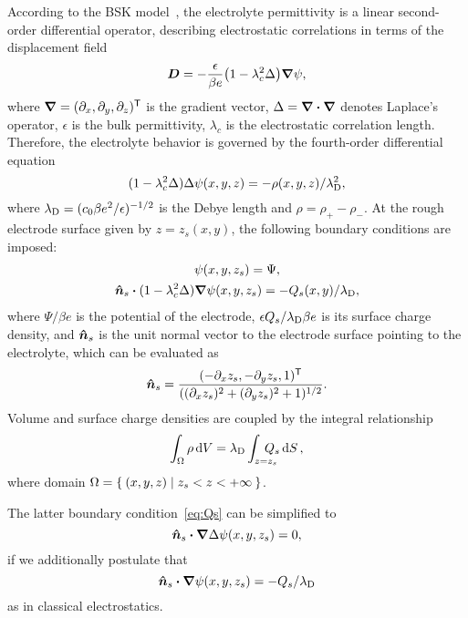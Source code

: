 According to the BSK model~\cite{bazant2011double}, the electrolyte permittivity is a linear second-order differential operator, describing electrostatic correlations in terms of the displacement field
\begin{equation}\label{eq:D}
    \vb*{D}=-\frac{\epsilon}{\beta e}\qty(1-\lambda_c^2\Delta)\grad\psi,
\end{equation}
where $\grad=(\partial_{x}, \partial_{y}, \partial_{z})^{\mathsf{T}}$ is the gradient vector, $\Delta=\grad\vdot\grad$ denotes Laplace's operator, $\epsilon$ is the bulk permittivity, $\lambda_c$ is the electrostatic correlation length. Therefore, the electrolyte behavior is governed by the fourth-order differential equation
\begin{equation}\label{eq:BSK}
    (1-\lambda_c^2\Delta)\Delta\psi(x,y,z) = -\rho(x,y,z)/\lambda_\text{D}^2,
\end{equation}
where $\lambda_\text{D}=(c_0\beta e^2/\epsilon)^{-1/2}$ is the Debye length and $\rho=\rho_+-\rho_-$.
At the rough electrode surface given by $z=z_s(x,y)$, the following boundary conditions are imposed:
\begin{gather}
    \psi(x,y,z_s) = \Psi, \label{eq:Psi} \\
    \bn_s\vdot(1-\lambda_c^2\Delta)\grad\psi(x,y,z_s) = -Q_s(x,y)/\lambdaD, \label{eq:Qs}
\end{gather}
where $\Psi/\beta e$ is the potential of the electrode, $\epsilon Q_s/\lambda_\text{D}\beta e$ is its surface charge density, and $\vu*{n}_s$ is the unit normal vector to the electrode surface pointing to the electrolyte, which can be evaluated as
\begin{equation}\label{eq:n_s}
    \vu*{n}_s = \frac{(-\partial_xz_s, -\partial_yz_s, 1)^{\mathsf{T}}}
        {((\partial_xz_s)^2 + (\partial_yz_s)^2 + 1)^{1/2}}.
\end{equation}
Volume and surface charge densities are coupled by the integral relationship
\begin{equation}\label{eq:integral_Omega}
    \int_\Omega\rho\dd{V} = \lambdaD\int_{\mathrlap{z=z_s}\hphantom\Omega}Q_s\dd{S},
\end{equation}
where domain $\Omega=\Set{(x,y,z) | z_s < z < +\infty}$.

The latter boundary condition~\eqref{eq:Qs} can be simplified to
\begin{equation}\label{eq:zero3}
    \bn_s\vdot\grad\Delta\psi(x,y,z_s) = 0,
\end{equation}
if we additionally postulate that
\begin{equation}\label{eq:Qs2}
    \bn_s\vdot\grad\psi(x,y,z_s) = -Q_s/\lambdaD
\end{equation}
as in classical electrostatics.


